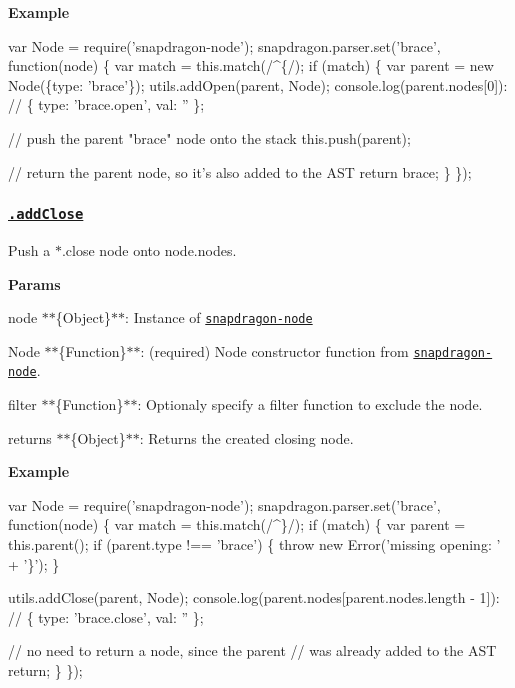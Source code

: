 {\bfseries Example}


\begin{DoxyCode}
var Node = require('snapdragon-node');
snapdragon.parser.set('brace', function(node) \{
  var match = this.match(/^\{/);
  if (match) \{
    var parent = new Node(\{type: 'brace'\});
    utils.addOpen(parent, Node);
    console.log(parent.nodes[0]):
    // \{ type: 'brace.open', val: '' \};

    // push the parent "brace" node onto the stack
    this.push(parent);

    // return the parent node, so it's also added to the AST
    return brace;
  \}
\});
\end{DoxyCode}


\subsubsection*{\href{index.js#L244}{\tt .add\+Close}}

Push a {\ttfamily $\ast$.close} node onto {\ttfamily node.\+nodes}.

{\bfseries Params}


\begin{DoxyItemize}
\item {\ttfamily node} $\ast$$\ast$\{Object\}$\ast$$\ast$\+: Instance of \href{https://github.com/jonschlinkert/snapdragon-node}{\tt snapdragon-\/node}
\item {\ttfamily Node} $\ast$$\ast$\{Function\}$\ast$$\ast$\+: (required) Node constructor function from \href{https://github.com/jonschlinkert/snapdragon-node}{\tt snapdragon-\/node}.
\item {\ttfamily filter} $\ast$$\ast$\{Function\}$\ast$$\ast$\+: Optionaly specify a filter function to exclude the node.
\item {\ttfamily returns} $\ast$$\ast$\{Object\}$\ast$$\ast$\+: Returns the created closing node.
\end{DoxyItemize}

{\bfseries Example}


\begin{DoxyCode}
var Node = require('snapdragon-node');
snapdragon.parser.set('brace', function(node) \{
  var match = this.match(/^\}/);
  if (match) \{
    var parent = this.parent();
    if (parent.type !== 'brace') \{
      throw new Error('missing opening: ' + '\}');
    \}

    utils.addClose(parent, Node);
    console.log(parent.nodes[parent.nodes.length - 1]):
    // \{ type: 'brace.close', val: '' \};

    // no need to return a node, since the parent
    // was already added to the AST
    return;
  \}
\});
\end{DoxyCode}


